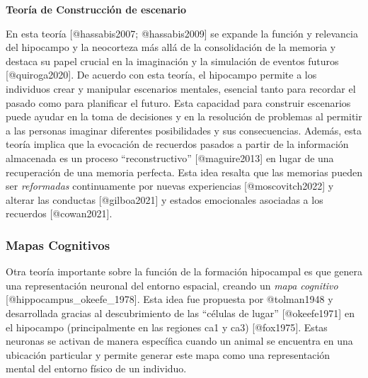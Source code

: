 \documentclass[
  11pt]{../MastersDoctoralThesisUNAM}
\begin{document}
\begin{tcolorbox}[enhanced jigsaw, colframe=quarto-callout-tip-color-frame, left=2mm, bottomrule=.15mm, rightrule=.15mm, arc=.35mm, toprule=.15mm, leftrule=.75mm, breakable, opacityback=0, colback=white]

\vspace{-3mm}\textbf{\textbf{Teoría de Construcción de escenario}}\vspace{3mm}

En esta teoría {[}@hassabis2007; @hassabis2009{]} se expande la función
y relevancia del hipocampo y la neocorteza más allá de la consolidación
de la memoria y destaca su papel crucial en la imaginación y la
simulación de eventos futuros {[}@quiroga2020{]}. De acuerdo con esta
teoría, el hipocampo permite a los individuos crear y manipular
escenarios mentales, esencial tanto para recordar el pasado como para
planificar el futuro. Esta capacidad para construir escenarios puede
ayudar en la toma de decisiones y en la resolución de problemas al
permitir a las personas imaginar diferentes posibilidades y sus
consecuencias. Además, esta teoría implica que la evocación de recuerdos
pasados a partir de la información almacenada es un proceso
``reconstructivo'' {[}@maguire2013{]} en lugar de una recuperación de
una memoria perfecta. Esta idea resalta que las memorias pueden ser
\emph{reformadas} continuamente por nuevas experiencias
{[}@moscovitch2022{]} y alterar las conductas {[}@gilboa2021{]} y
estados emocionales asociadas a los recuerdos {[}@cowan2021{]}.

\end{tcolorbox}

\subsubsection{Mapas Cognitivos}\label{sec-mapa}

Otra teoría importante sobre la función de la formación hipocampal es
que genera una representación neuronal del entorno espacial, creando un
\emph{mapa cognitivo} {[}@hippocampus\_okeefe\_1978{]}. Esta idea fue
propuesta por @tolman1948 y desarrollada gracias al descubrimiento de
las ``células de lugar'' {[}@okeefe1971{]} en el hipocampo
(principalmente en las regiones \ac{ca}1 y \ac{ca}3) {[}@fox1975{]}.
Estas neuronas se activan de manera específica cuando un animal se
encuentra en una ubicación particular y permite generar este mapa como
una representación mental del entorno físico de un individuo.
\end{document}
